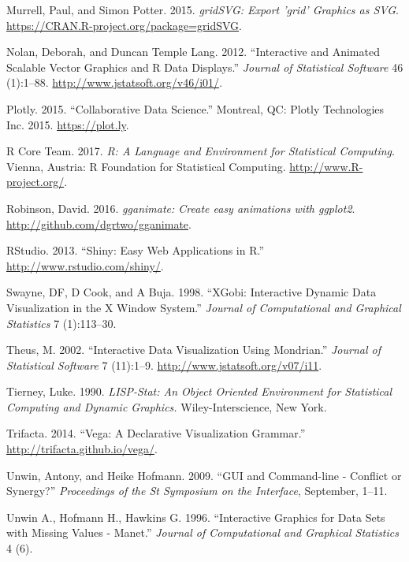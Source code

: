 \documentclass[12pt,]{article}
\theoremstyle{definition}
\theoremstyle{definition}
\theoremstyle{definition}
\theoremstyle{remark}
\begin{document}
\leavevmode\hypertarget{ref-gridSVG}{}%
Murrell, Paul, and Simon Potter. 2015. \emph{gridSVG: Export 'grid'
Graphics as SVG}. \url{https://CRAN.R-project.org/package=gridSVG}.

\leavevmode\hypertarget{ref-SVGAnnotation}{}%
Nolan, Deborah, and Duncan Temple Lang. 2012. ``Interactive and Animated
Scalable Vector Graphics and R Data Displays.'' \emph{Journal of
Statistical Software} 46 (1):1--88.
\url{http://www.jstatsoft.org/v46/i01/}.

\leavevmode\hypertarget{ref-plotly}{}%
Plotly. 2015. ``Collaborative Data Science.'' Montreal, QC: Plotly
Technologies Inc. 2015. \url{https://plot.ly}.

\leavevmode\hypertarget{ref-RCore}{}%
R Core Team. 2017. \emph{R: A Language and Environment for Statistical
Computing}. Vienna, Austria: R Foundation for Statistical Computing.
\url{http://www.R-project.org/}.

\leavevmode\hypertarget{ref-gganimate}{}%
Robinson, David. 2016. \emph{gganimate: Create easy animations with
ggplot2}. \url{http://github.com/dgrtwo/gganimate}.

\leavevmode\hypertarget{ref-shiny}{}%
RStudio. 2013. ``Shiny: Easy Web Applications in R.''
\url{http://www.rstudio.com/shiny/}.

\leavevmode\hypertarget{ref-xgobi}{}%
Swayne, DF, D Cook, and A Buja. 1998. ``XGobi: Interactive Dynamic Data
Visualization in the X Window System.'' \emph{Journal of Computational
and Graphical Statistics} 7 (1):113--30.

\leavevmode\hypertarget{ref-mondrian}{}%
Theus, M. 2002. ``Interactive Data Visualization Using Mondrian.''
\emph{Journal of Statistical Software} 7 (11):1--9.
\url{http://www.jstatsoft.org/v07/i11}.

\leavevmode\hypertarget{ref-LISP-STAT}{}%
Tierney, Luke. 1990. \emph{LISP-Stat: An Object Oriented Environment for
Statistical Computing and Dynamic Graphics.} Wiley-Interscience, New
York.

\leavevmode\hypertarget{ref-vega}{}%
Trifacta. 2014. ``Vega: A Declarative Visualization Grammar.''
\url{http://trifacta.github.io/vega/}.

\leavevmode\hypertarget{ref-Unwin:1999vp}{}%
Unwin, Antony, and Heike Hofmann. 2009. ``GUI and Command-line -
Conflict or Synergy?'' \emph{Proceedings of the St Symposium on the
Interface}, September, 1--11.

\leavevmode\hypertarget{ref-MANET}{}%
Unwin A., Hofmann H., Hawkins G. 1996. ``Interactive Graphics for Data
Sets with Missing Values - Manet.'' \emph{Journal of Computational and
Graphical Statistics} 4 (6).
\end{document}
